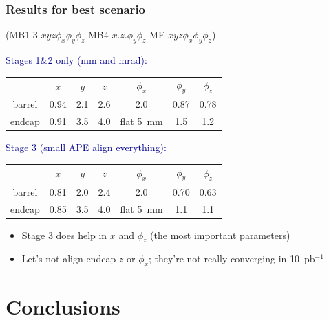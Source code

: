 \documentclass[compress]{beamer}
\begin{document}
\begin{frame}
\frametitle{Results for best scenario}

\vspace{-0.8 cm} \hfill {\scriptsize (MB1-3 $xyz\phi_x\phi_y\phi_z$ MB4 $x.z.\phi_y\phi_z$ ME $xyz\phi_x\phi_y\phi_z$) \mbox{\hspace{-0.25 cm}}}

\vspace{0.4 cm}
\hspace{-0.83 cm} \textcolor{darkblue}{Stages 1\&2 only (mm and mrad):}

\begin{tabular}{c c c c c c c}
\mbox{ } & $x$ & $y$ & $z$ & $\phi_x$ & $\phi_y$ & $\phi_z$ \\
barrel & 0.94 & 2.1 & 2.6 & 2.0 & 0.87 & 0.78 \\
endcap & 0.91 & 3.5 & 4.0 & flat 5~mm & 1.5 & 1.2
\end{tabular}

\vspace{0.5 cm}

\hspace{-0.83 cm} \textcolor{darkblue}{Stage 3 (small APE align everything):}

\begin{tabular}{c c c c c c c}
\mbox{ } & $x$ & $y$ & $z$ & $\phi_x$ & $\phi_y$ & $\phi_z$ \\
barrel & 0.81 & 2.0 & 2.4 & 2.0 & 0.70 & 0.63 \\
endcap & 0.85 & 3.5 & 4.0 & flat 5~mm & 1.1 & 1.1
\end{tabular}

\vspace{0.2 cm}
\begin{itemize}
\item Stage 3 does help in $x$ and $\phi_z$ (the most important parameters)
\item Let's not align endcap $z$ or $\phi_x$; they're not really converging in 10~pb$^{-1}$
\end{itemize}
\end{frame}

\section*{Conclusions}
\end{document}
